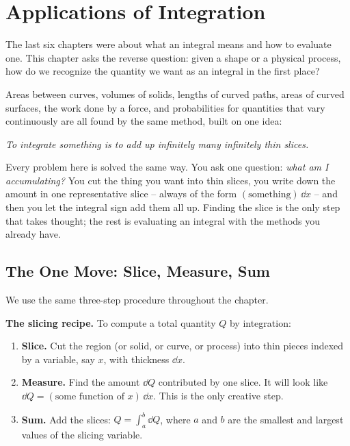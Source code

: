 \chapter{Applications of Integration}

The last six chapters were about what an integral means and how to evaluate one.
This chapter asks the reverse question: given a shape or a physical process, how do
we recognize the quantity we want as an integral in the first place?

Areas between curves, volumes of solids, lengths of curved paths, areas of curved
surfaces, the work done by a force, and probabilities for quantities that vary
continuously are all found by the same method, built on one idea:

\begin{center}
\emph{To integrate something is to add up infinitely many infinitely thin slices.}
\end{center}

Every problem here is solved the same way. You ask one question: \emph{what am I
accumulating?} You cut the thing you want into thin slices, you write down the
amount in one representative slice -- always of the form
$(\text{something})\,\dd x$ -- and then you let the integral sign add them all up.
Finding the slice is the only step that takes thought; the rest is evaluating an
integral with the methods you already have.

\chapterline

\section{The One Move: Slice, Measure, Sum}
\label{ch26:onemove}

We use the same three-step procedure throughout the chapter.

\begin{focusbox}
\textbf{The slicing recipe.} To compute a total quantity $Q$ by integration:
\begin{enumerate}
  \item \textbf{Slice.} Cut the region (or solid, or curve, or process) into
  thin pieces indexed by a variable, say $x$, with thickness $\dd x$.
  \item \textbf{Measure.} Find the amount $\dd Q$ contributed by one slice. It
  will look like $\dd Q = (\text{some function of }x)\,\dd x$. This is the only
  creative step.
  \item \textbf{Sum.} Add the slices: $Q = \int_a^b \dd Q$, where $a$ and $b$
  are the smallest and largest values of the slicing variable.
\end{enumerate}
\end{focusbox}

